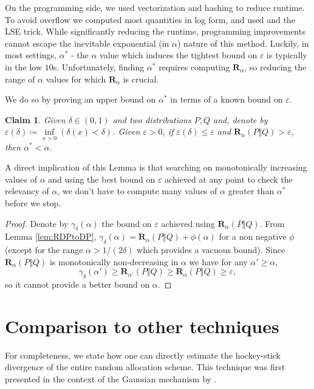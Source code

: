 \documentclass{article}
\theoremstyle{plain}
\newtheorem{claim}[theorem]{Claim}
\theoremstyle{definition}
\newcommand{\eps}{\varepsilon}
\newcommand{\Renyi}[1]{\boldsymbol{R}_{#1}}
\newcommand{\RenyiDiv}[3]{\Renyi{#1}\left(#2 \Vert #3 \right)}
\begin{document}
On the programming side, we used vectorization and hashing to reduce runtime. To avoid overflow we computed most quantities in log form, and used and the LSE trick. While significantly reducing the runtime, programming improvements cannot escape the inevitable exponential (in $\alpha$) nature of this method. Luckily, in most settings, $\alpha^{*}$ - the $\alpha$ value which induces the tightest bound on $\eps$ is typically in the low $10$s. Unfortunately, finding $\alpha^{*}$ requires computing $\Renyi{\alpha}$, so reducing the range of $\alpha$ values for which $\Renyi{\alpha}$ is crucial.

We do so by proving an upper bound on $\alpha^{*}$ in terms of a known bound on $\eps$.
\begin{claim}
    Given $\delta \in (0,1)$ and two distributions $P, Q$ and, denote by $\varepsilon(\delta) \coloneqq \underset{x > 0}{\inf}(\delta(x) < \delta)$. Given $\eps > 0$, if $\varepsilon(\delta) \le \eps$ and $\RenyiDiv{\alpha}{P}{Q} > \eps$, then $\alpha^{*} < \alpha$.
\end{claim}
A direct implication of this Lemma is that searching on monotonically increasing values of $\alpha$ and using the best bound on $\eps$ achieved at any point to check the relevancy of $\alpha$, we don't have to compute many values of $\alpha$ greater than $\alpha^{*}$ before we stop.

\begin{proof}
    Denote by $\gamma_{\delta}(\alpha)$ the bound on $\eps$ achieved using $\RenyiDiv{\alpha}{P}{Q}$. From Lemma \ref{lem:RDPtoDP}, $\gamma_{\delta}(\alpha) = \RenyiDiv{\alpha}{P}{Q} + \phi(\alpha)$ for a non negative $\phi$ (except for the range $\alpha > 1/(2 \delta)$ which provides a vacuous bound). Since $\RenyiDiv{\alpha}{P}{Q}$ is monotonically non-decreasing in $\alpha$ we have for any $\alpha' \ge \alpha$, 
    \[
        \gamma_{\delta}(\alpha') \ge \RenyiDiv{\alpha'}{P}{Q} \ge \RenyiDiv{\alpha}{P}{Q} \ge \eps,
    \]
    so it cannot provide a better bound on $\alpha$.
\end{proof}

\section{Comparison to other techniques}
For completeness, we state how one can directly estimate the hockey-stick divergence of the entire random allocation scheme. This technique was first presented in the context of the Gaussian mechanism by \cite{CGHLKKMSZ24}.
\end{document}
